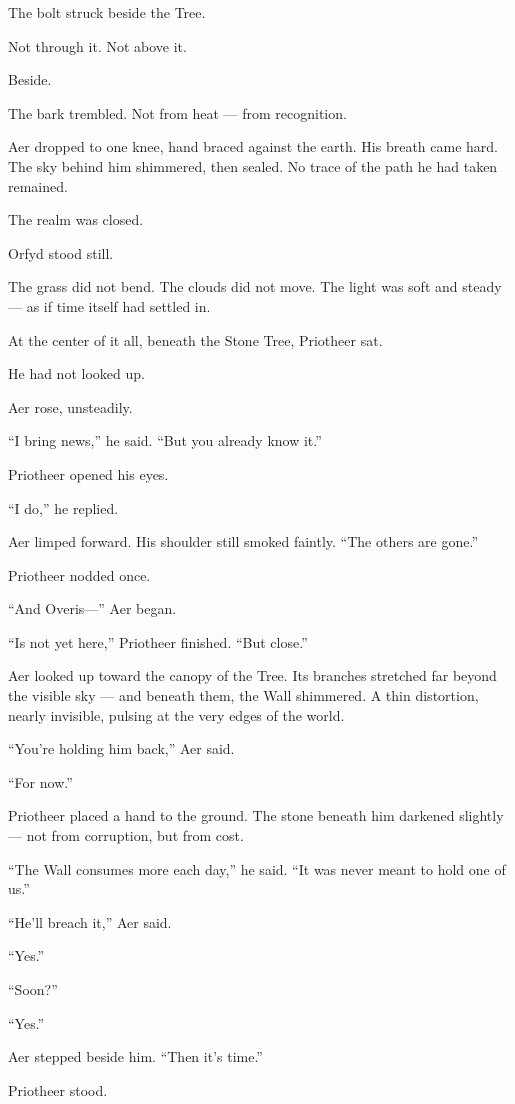 \documentclass[9pt]{article}
\begin{document}
The bolt struck beside the Tree.

Not through it. Not above it.

Beside.

The bark trembled. Not from heat — from recognition.

Aer dropped to one knee, hand braced against the earth. His breath came hard. The sky behind him shimmered, then sealed. No trace of the path he had taken remained.

The realm was closed.

Orfyd stood still.

The grass did not bend. The clouds did not move. The light was soft and steady — as if time itself had settled in.

At the center of it all, beneath the Stone Tree, Priotheer sat.

He had not looked up.

Aer rose, unsteadily.

``I bring news,'' he said. ``But you already know it.''

Priotheer opened his eyes.

``I do,'' he replied.

Aer limped forward. His shoulder still smoked faintly. ``The others are gone.''

Priotheer nodded once.

``And Overis—'' Aer began.

``Is not yet here,'' Priotheer finished. ``But close.''

Aer looked up toward the canopy of the Tree. Its branches stretched far beyond the visible sky — and beneath them, the Wall shimmered. A thin distortion, nearly invisible, pulsing at the very edges of the world.

``You’re holding him back,'' Aer said.

``For now.''

Priotheer placed a hand to the ground. The stone beneath him darkened slightly — not from corruption, but from cost.

``The Wall consumes more each day,'' he said. ``It was never meant to hold one of us.''

``He’ll breach it,'' Aer said.

``Yes.''

``Soon?''

``Yes.''

Aer stepped beside him. ``Then it’s time.''

Priotheer stood.
\end{document}
